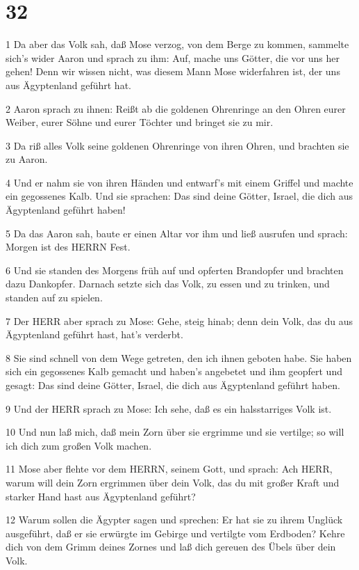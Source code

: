 \chapter{32}

\par 1 Da aber das Volk sah, daß Mose verzog, von dem Berge zu kommen, sammelte sich's wider Aaron und sprach zu ihm: Auf, mache uns Götter, die vor uns her gehen! Denn wir wissen nicht, was diesem Mann Mose widerfahren ist, der uns aus Ägyptenland geführt hat.
\par 2 Aaron sprach zu ihnen: Reißt ab die goldenen Ohrenringe an den Ohren eurer Weiber, eurer Söhne und eurer Töchter und bringet sie zu mir.
\par 3 Da riß alles Volk seine goldenen Ohrenringe von ihren Ohren, und brachten sie zu Aaron.
\par 4 Und er nahm sie von ihren Händen und entwarf's mit einem Griffel und machte ein gegossenes Kalb. Und sie sprachen: Das sind deine Götter, Israel, die dich aus Ägyptenland geführt haben!
\par 5 Da das Aaron sah, baute er einen Altar vor ihm und ließ ausrufen und sprach: Morgen ist des HERRN Fest.
\par 6 Und sie standen des Morgens früh auf und opferten Brandopfer und brachten dazu Dankopfer. Darnach setzte sich das Volk, zu essen und zu trinken, und standen auf zu spielen.
\par 7 Der HERR aber sprach zu Mose: Gehe, steig hinab; denn dein Volk, das du aus Ägyptenland geführt hast, hat's verderbt.
\par 8 Sie sind schnell von dem Wege getreten, den ich ihnen geboten habe. Sie haben sich ein gegossenes Kalb gemacht und haben's angebetet und ihm geopfert und gesagt: Das sind deine Götter, Israel, die dich aus Ägyptenland geführt haben.
\par 9 Und der HERR sprach zu Mose: Ich sehe, daß es ein halsstarriges Volk ist.
\par 10 Und nun laß mich, daß mein Zorn über sie ergrimme und sie vertilge; so will ich dich zum großen Volk machen.
\par 11 Mose aber flehte vor dem HERRN, seinem Gott, und sprach: Ach HERR, warum will dein Zorn ergrimmen über dein Volk, das du mit großer Kraft und starker Hand hast aus Ägyptenland geführt?
\par 12 Warum sollen die Ägypter sagen und sprechen: Er hat sie zu ihrem Unglück ausgeführt, daß er sie erwürgte im Gebirge und vertilgte vom Erdboden? Kehre dich von dem Grimm deines Zornes und laß dich gereuen des Übels über dein Volk.
